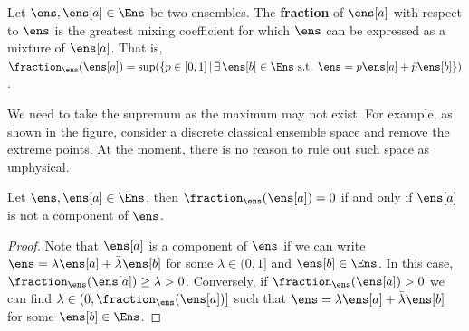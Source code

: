 \begin{mathSection}
	\begin{defn}
		Let $\ens, \ens[a] \in \Ens$ be two ensembles. The \textbf{fraction} of $\ens[a]$ with respect to $\ens$ is the greatest mixing coefficient for which $\ens$ can be expressed as a mixture of $\ens[a]$. That is, $\fraction_{\ens}(\ens[a]) = \sup(\{ p \in [0,1] \, | \, \exists \, \ens[b] \in \Ens \text{ s.t. }  \ens = p \ens[a] + \bar{p} \ens[b] \})$.
	\end{defn}

\begin{figure}[H]
	\centering
\end{figure}
	
	\begin{remark}
		We need to take the supremum as the maximum may not exist. For example, as shown in the figure, consider a discrete classical ensemble space and remove the extreme points. At the moment, there is no reason to rule out such space as unphysical.
	\end{remark}
	
	\begin{coro}
		Let $\ens, \ens[a] \in \Ens$, then $\fraction_{\ens}(\ens[a]) = 0$ if and only if $\ens[a]$ is not a component of $\ens$.
	\end{coro}
	
	\begin{proof}
		Note that $\ens[a]$ is a component of $\ens$ if we can write $\ens = \lambda \ens[a] + \bar{\lambda} \ens[b]$ for some $\lambda \in (0,1]$ and $\ens[b] \in \Ens$. In this case, $\fraction_{\ens}(\ens[a]) \geq \lambda > 0$. Conversely, if $\fraction_{\ens}(\ens[a]) > 0$ we can find $\lambda \in (0,\fraction_{\ens}(\ens[a])]$ such that $\ens = \lambda \ens[a] + \bar{\lambda} \ens[b]$ for some $\ens[b] \in \Ens$.
	\end{proof}
\end{mathSection}

